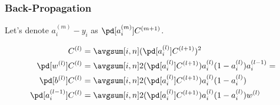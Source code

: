 \documentclass{article}
\begin{document}
\subsubsection{Back-Propagation}

Let's denote $a_i^{(m)} - y_i$ as $\pd[a_i^{(m)}]C^{(m+1)}$.

\begin{align}
  C^{(l)} &= \avgsum[i, n] (\pd[a_i^{(l)}]C^{(l+1)})^2 \\
  \pd[w^{(l)}]C^{(l)} &= \avgsum[i, n] 2(\pd[a_i^{(l)}]C^{(l+1)})a_i^{(l)}(1 - a_i^{(l)})a_i^{(l-1)} =\\
  \pd[b^{(l)}]C^{(l)} &= \avgsum[i, n] 2(\pd[a_i^{(l)}]C^{(l+1)})a_i^{(l)}(1 - a_i^{(l)}) \\
  \pd[a_i^{(l-1)}]C^{(l)} &= \avgsum[i, n] 2(\pd[a_i^{(l)}]C^{(l+1)})a_i^{(l)}(1 - a_i^{(l)})w^{(l)}
\end{align}
\end{document}
